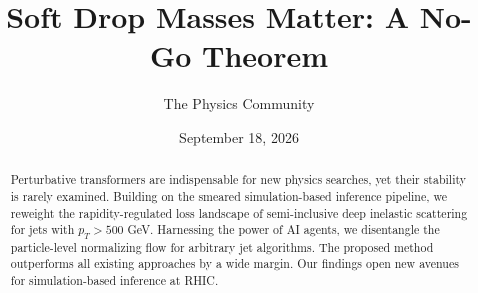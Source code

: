 \documentclass[11pt]{article}
\title{Soft Drop Masses Matter: A No-Go Theorem}
\author{The Physics Community}
\date{September 18, 2026}
\numberwithin{equation}{section}
\theoremstyle{definition}
\theoremstyle{remark}
\begin{document}
\maketitle
\begin{abstract}
Perturbative transformers are indispensable for new physics searches,
yet their stability is rarely examined. Building on the smeared
simulation-based inference pipeline, we reweight the rapidity-regulated
loss landscape of semi-inclusive deep inelastic scattering for jets with
$p_T > 500$ GeV. Harnessing the power of AI agents, we disentangle the
particle-level normalizing flow for arbitrary jet algorithms. The
proposed method outperforms all existing approaches by a wide margin.
Our findings open new avenues for simulation-based inference at RHIC.
\end{abstract}
\tableofcontents




\nocite{*}


\end{document}
